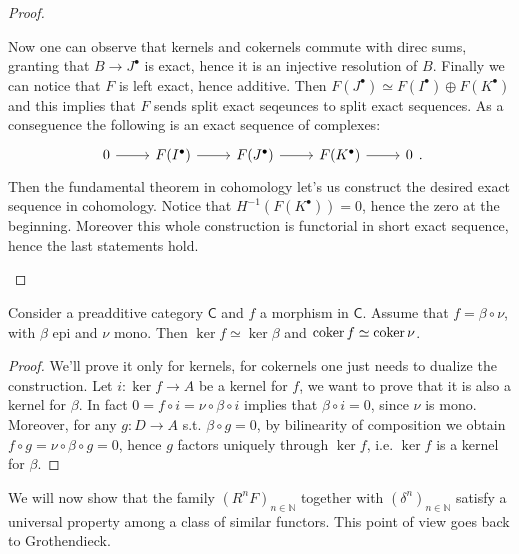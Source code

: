 \documentclass[../Main]{subfiles}
\begin{document}
\begin{proof}
\begin{enumerate}
		Now one can observe that kernels and cokernels commute with direc sums, granting
		that $B \to J^\bullet$ is exact, hence it is an injective resolution of $B$.
		Finally we can notice that $F$ is left exact, hence additive.
		Then $F(J^\bullet) \simeq F(I^\bullet) \oplus F(K^\bullet)$ and this implies
		that $F$ sends split exact seqeunces to split exact sequences.
		As a conseguence the following is an exact sequence of complexes:
		\begin{equation}
		\begin{tikzcd}
			0 \arrow[r, "", rightarrow] &
			F(I^\bullet) \arrow[r, "", rightarrow] &
			F(J^\bullet) \arrow[r, "", rightarrow] &
			F(K^\bullet) \arrow[r, "", rightarrow] &
			0
		\end{tikzcd}
		.\end{equation} 
		Then the fundamental theorem in cohomology let's us construct the desired
		exact sequence in cohomology.
		Notice that $H^{-1} \left( F(K^\bullet) \right) = 0$, hence the zero at the beginning.
		Moreover this whole construction is functorial in
		short exact sequence, hence the last statements hold.\qedhere
\end{enumerate}
\end{proof}

\begin{lem}
	Consider a preadditive category $\mathsf{C}$ and $f$
	a morphism in $\mathsf{C}$.
	Assume that $f = \beta \circ \nu$, with $\beta$ epi and $\nu$ mono.
	Then $\ker f \simeq \ker \beta$ and $\operatorname{coker} f \simeq \operatorname{coker} \nu$.
\end{lem} 
\begin{proof}
	We'll prove it only for kernels, for cokernels one just needs to dualize the construction.
	Let $i\colon \ker f \to A$ be a kernel for $f$, we want to prove that
	it is also a kernel for $\beta$. In fact
	$0 = f \circ i = \nu \circ \beta \circ i$ implies that
	$\beta \circ i = 0$, since $\nu$ is mono.
	Moreover, for any $g\colon D \to A$ s.t. $\beta \circ g = 0$, by bilinearity of
	composition we obtain $f \circ g = \nu \circ \beta \circ g = 0$, hence
	$g$ factors uniquely through $\ker f$, i.e. $\ker f$ is a kernel for $\beta$.
\end{proof}

We will now show that the family $\left( R^{n}F \right)_{n \in \mathbb{N}}$ together
with $\left( \delta^n \right)_{n \in \mathbb{N}}$
satisfy a universal property among a class of similar functors.
This point of view goes back to Grothendieck.
\end{document}
